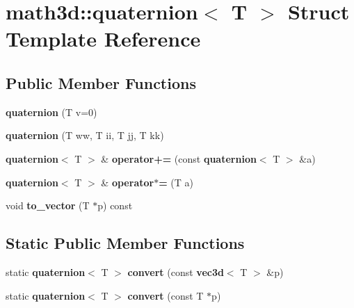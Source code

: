 \section{math3d\-:\-:quaternion$<$ T $>$ Struct Template Reference}
\label{structmath3d_1_1quaternion}
\subsection*{Public Member Functions}
\begin{DoxyCompactItemize}
\item 
{\bfseries quaternion} (T v=0)\label{structmath3d_1_1quaternion_a6211f03d73932fab3ed0921d0368e8ec}

\item 
{\bfseries quaternion} (T ww, T ii, T jj, T kk)\label{structmath3d_1_1quaternion_aef247ee044dfb341179cfd0dae37ac81}

\item 
{\bf quaternion}$<$ T $>$ \& {\bfseries operator+=} (const {\bf quaternion}$<$ T $>$ \&a)\label{structmath3d_1_1quaternion_a50529e56a0b88bbc9d8951e1e1728c17}

\item 
{\bf quaternion}$<$ T $>$ \& {\bfseries operator$\ast$=} (T a)\label{structmath3d_1_1quaternion_ac14a0fc109dea3e9fedab60a61ec5520}

\item 
void {\bfseries to\-\_\-vector} (T $\ast$p) const \label{structmath3d_1_1quaternion_a1be6f18bfb3422444e18fc9467cb070a}

\end{DoxyCompactItemize}
\subsection*{Static Public Member Functions}
\begin{DoxyCompactItemize}
\item 
static {\bf quaternion}$<$ T $>$ {\bfseries convert} (const {\bf vec3d}$<$ T $>$ \&p)\label{structmath3d_1_1quaternion_a1d5de4882a0033e79444465d886b4c1e}

\item 
static {\bf quaternion}$<$ T $>$ {\bfseries convert} (const T $\ast$p)\label{structmath3d_1_1quaternion_a2568d5443d6f5362e6252710d12cb006}

\end{DoxyCompactItemize}
